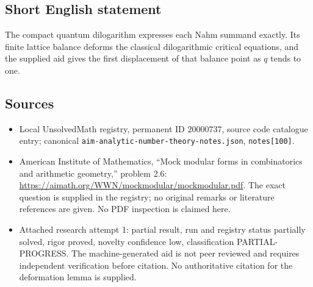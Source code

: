 \documentclass[11pt]{article}
\begin{document}
\subsection{Short English statement}
The compact quantum dilogarithm expresses each Nahm summand exactly. Its finite lattice balance deforms the classical dilogarithmic critical equations, and the supplied aid gives the first displacement of that balance point as $q$ tends to one.
\subsection{Sources}
\begin{itemize}
\item Local UnsolvedMath registry, permanent ID $20000737$, source code catalogue entry; canonical \texttt{aim-analytic-number-theory-notes.json}, \texttt{notes[100]}.
\item American Institute of Mathematics, ``Mock modular forms in combinatorics and arithmetic geometry,'' problem 2.6: \url{https://aimath.org/WWN/mockmodular/mockmodular.pdf}. The exact question is supplied in the registry; no original remarks or literature references are given. No PDF inspection is claimed here.
\item Attached research attempt 1: partial result, run and registry status partially solved, rigor proved, novelty confidence low, classification PARTIAL-PROGRESS. The machine-generated aid is not peer reviewed and requires independent verification before citation. No authoritative citation for the deformation lemma is supplied.
\end{itemize}
\end{document}
